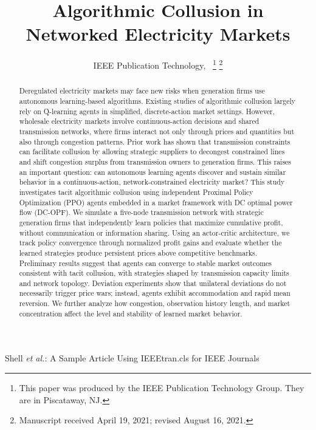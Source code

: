 \documentclass[lettersize,journal]{IEEEtran}
\begin{document}
\title{Algorithmic Collusion in Networked Electricity Markets}

\author{IEEE Publication Technology,~
\thanks{This paper was produced by the IEEE Publication Technology Group. They are in Piscataway, NJ.}%
\thanks{Manuscript received April 19, 2021; revised August 16, 2021.}}

%
{Shell \MakeLowercase{\textit{et al.}}: A Sample Article Using IEEEtran.cls for IEEE Journals}


\maketitle

\begin{abstract}
Deregulated electricity markets may face new risks when generation firms use autonomous learning-based algorithms. Existing studies of algorithmic collusion largely rely on Q-learning agents in simplified, discrete-action market settings. However, wholesale electricity markets involve continuous-action decisions and shared transmission networks, where firms interact not only through prices and quantities but also through congestion patterns. Prior work has shown that transmission constraints can facilitate collusion by allowing strategic suppliers to decongest constrained lines and shift congestion surplus from transmission owners to generation firms. This raises an important question: can autonomous learning agents discover and sustain similar behavior in a continuous-action, network-constrained electricity market? This study investigates tacit algorithmic collusion using independent Proximal Policy Optimization (PPO) agents embedded in a market framework with DC optimal power flow (DC-OPF). We simulate a five-node transmission network with strategic generation firms that independently learn policies that maximize cumulative profit, without communication or information sharing. Using an actor-critic architecture, we track policy convergence through normalized profit gains and evaluate whether the learned strategies produce persistent prices above competitive benchmarks. Preliminary results suggest that agents can converge to stable market outcomes consistent with tacit collusion, with strategies shaped by transmission capacity limits and network topology. Deviation experiments show that unilateral deviations do not necessarily trigger price wars; instead, agents exhibit accommodation and rapid mean reversion. We further analyze how congestion, observation history length, and market concentration affect the level and stability of learned market behavior.
\end{abstract}
\end{document}
